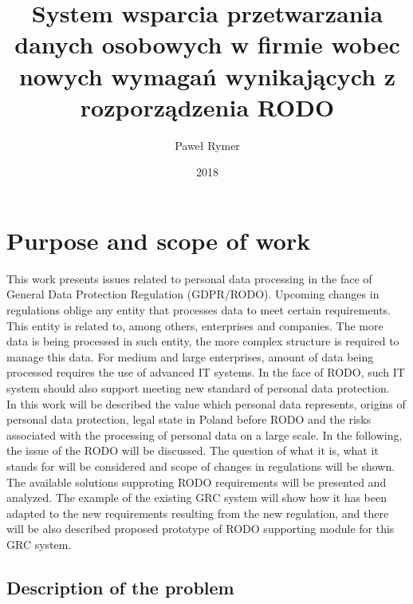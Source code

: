 \documentclass[en, noamssymb]{mgr}
\title{System wsparcia przetwarzania danych osobowych
w firmie wobec nowych wymagań wynikających z rozporządzenia RODO}
\author{Paweł Rymer}
\date{2018} %
\begin{document}

\maketitle %

\tableofcontents %

\chapter{Purpose and scope of work} \label{sec:sekcjaWprowadzenie}



This work presents issues related to personal data processing in the face of General Data Protection Regulation (GDPR/RODO). Upcoming changes in regulations oblige any entity that processes data to meet certain requirements. This entity is related to, among others, enterprises and companies. The more data is being processed in such entity, the more complex structure is required to manage this data. For medium and large enterprises, amount of data being processed requires the use of advanced IT systems. In the face of RODO, such IT system should also support meeting new standard of personal data protection.\\
\indent In this work will be described the value which personal data represents,  origins of personal data protection, legal state in Poland before RODO and the risks associated with the processing of personal data on a large scale. In the following, the issue of the RODO will be discussed. The question of what it is, what it stands for will be considered and scope of changes in regulations will be shown. The available solutions supproting RODO requirements will be presented and analyzed. The example of the existing GRC system will show how it has been adapted to the new requirements resulting from the new regulation, and there will be also described proposed prototype of RODO supporting module for this GRC system.

\section{Description of the problem}
\end{document}
